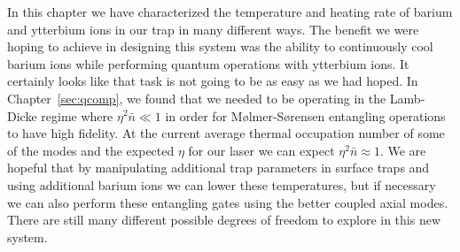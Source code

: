 In this chapter we have characterized the temperature and heating rate of barium and ytterbium ions in our trap in many different ways.  The benefit we were hoping to achieve in designing this system was the ability to continuously cool barium ions while performing quantum operations with ytterbium ions.  It certainly looks like that task is not going to be as easy as we had hoped.  In Chapter~\ref{sec:qcomp}, we found that we needed to be operating in the Lamb-Dicke regime where $\eta^2 \bar{n} \ll 1$ in order for M\o{}lmer-S\o{}rensen entangling operations to have high fidelity.  At the current average thermal occupation number of some of the modes and the expected $\eta$ for our laser we can expect $\eta^2 \bar{n} \approx 1$.  We are hopeful that by manipulating additional trap parameters in surface traps and using additional barium ions we can lower these temperatures, but if necessary we can also perform these entangling gates using the better coupled axial modes.  There are still many different possible degrees of freedom to explore in this new system.

